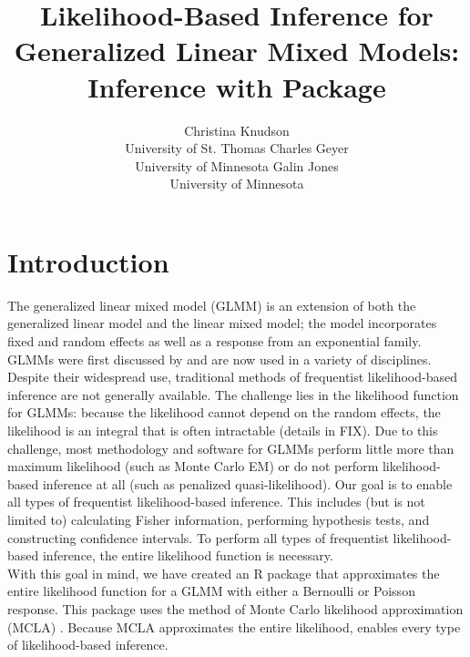 \documentclass[article]{jss}
\author{Christina Knudson\\ University of St. Thomas \And 
        Charles Geyer\\University of Minnesota \And 
        Galin Jones\\University of Minnesota}
\title{ Likelihood-Based Inference for Generalized Linear Mixed Models: Inference with Package \pkg{glmm}}
\begin{document}

\section{Introduction}
The generalized linear mixed model (GLMM) is an extension of both the generalized linear model and the linear mixed model; the model incorporates  fixed and random effects as well as a response from an exponential family.   GLMMs were first discussed by \citet{stiratelli:laird:ware:1984} and are now  used in a variety of disciplines. Despite their widespread use, traditional methods of frequentist likelihood-based inference are not generally available. The challenge lies in the likelihood function for GLMMs: because the likelihood cannot depend on the random effects, the likelihood is an  integral that is often intractable (details    in FIX). Due to this challenge, most methodology and software for  GLMMs perform little more than maximum likelihood (such as Monte Carlo EM)  or do not perform likelihood-based inference at all (such as penalized quasi-likelihood). 
Our goal is to enable all types of frequentist likelihood-based inference. This includes (but is not limited to) calculating Fisher information, performing hypothesis tests, and constructing confidence intervals.  To perform all types of frequentist likelihood-based inference, the entire likelihood function is necessary.\\


With this goal in mind, we have created an R package  \citep{glmm:package} that approximates the entire likelihood function for a GLMM with either a Bernoulli or Poisson response. This package uses  the method of
 Monte Carlo likelihood approximation (MCLA) \citep{geyer:1994, geyer:thom:1992,  sung:geyer:2007}. 
Because MCLA approximates the entire likelihood,   enables  every type of likelihood-based inference. \\

\end{document}
